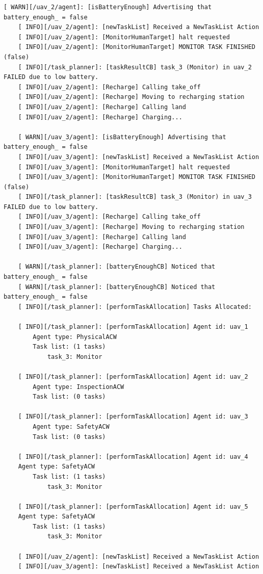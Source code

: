 \begin{lstlisting}[caption={Feedback messages printed after the battery of two \glspl{UAV} unexpectedly ran out of power}, breaklines=true, label=exit:BatOff]
    [ WARN][/uav_2/agent]: [isBatteryEnough] Advertising that battery_enough_ = false
    [ INFO][/uav_2/agent]: [newTaskList] Received a NewTaskList Action
    [ INFO][/uav_2/agent]: [MonitorHumanTarget] halt requested
    [ INFO][/uav_2/agent]: [MonitorHumanTarget] MONITOR TASK FINISHED (false)
    [ INFO][/task_planner]: [taskResultCB] task_3 (Monitor) in uav_2 FAILED due to low battery.
    [ INFO][/uav_2/agent]: [Recharge] Calling take_off
    [ INFO][/uav_2/agent]: [Recharge] Moving to recharging station
    [ INFO][/uav_2/agent]: [Recharge] Calling land
    [ INFO][/uav_2/agent]: [Recharge] Charging...
    
    [ WARN][/uav_3/agent]: [isBatteryEnough] Advertising that battery_enough_ = false
    [ INFO][/uav_3/agent]: [newTaskList] Received a NewTaskList Action
    [ INFO][/uav_3/agent]: [MonitorHumanTarget] halt requested
    [ INFO][/uav_3/agent]: [MonitorHumanTarget] MONITOR TASK FINISHED (false)
    [ INFO][/task_planner]: [taskResultCB] task_3 (Monitor) in uav_3 FAILED due to low battery.
    [ INFO][/uav_3/agent]: [Recharge] Calling take_off
    [ INFO][/uav_3/agent]: [Recharge] Moving to recharging station
    [ INFO][/uav_3/agent]: [Recharge] Calling land
    [ INFO][/uav_3/agent]: [Recharge] Charging...

    [ WARN][/task_planner]: [batteryEnoughCB] Noticed that battery_enough_ = false
    [ WARN][/task_planner]: [batteryEnoughCB] Noticed that battery_enough_ = false
    [ INFO][/task_planner]: [performTaskAllocation] Tasks Allocated:
    
    [ INFO][/task_planner]: [performTaskAllocation] Agent id: uav_1
        Agent type: PhysicalACW
        Task list: (1 tasks)
            task_3: Monitor
    
    [ INFO][/task_planner]: [performTaskAllocation] Agent id: uav_2
        Agent type: InspectionACW
        Task list: (0 tasks)
    
    [ INFO][/task_planner]: [performTaskAllocation] Agent id: uav_3
        Agent type: SafetyACW
        Task list: (0 tasks)
    
    [ INFO][/task_planner]: [performTaskAllocation] Agent id: uav_4
    Agent type: SafetyACW
        Task list: (1 tasks)
            task_3: Monitor
    
    [ INFO][/task_planner]: [performTaskAllocation] Agent id: uav_5
    Agent type: SafetyACW
        Task list: (1 tasks)
            task_3: Monitor
    
    [ INFO][/uav_2/agent]: [newTaskList] Received a NewTaskList Action
    [ INFO][/uav_3/agent]: [newTaskList] Received a NewTaskList Action
\end{lstlisting}

